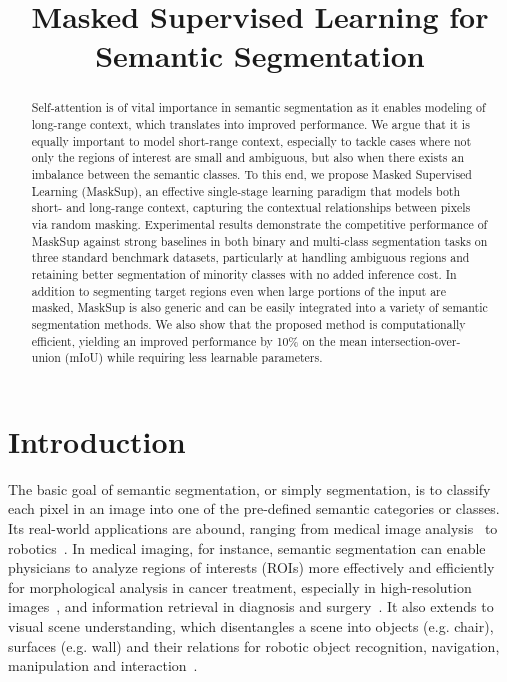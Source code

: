 \documentclass{bmvc2k}
\title{Masked Supervised Learning for Semantic Segmentation}
\begin{document}
\maketitle

\begin{abstract}
Self-attention is of vital importance in semantic segmentation as it enables modeling of long-range context, which translates into improved performance. We argue that it is equally important to model short-range context, especially to tackle cases where not only the regions of interest are small and ambiguous, but also when there exists an imbalance between the semantic classes. To this end, we propose Masked Supervised Learning (MaskSup), an effective single-stage learning paradigm that models both short- and long-range context, capturing the contextual relationships between pixels via random masking. Experimental results demonstrate the competitive performance of MaskSup against strong baselines in both binary and multi-class segmentation tasks on three standard benchmark datasets, particularly at handling ambiguous regions and retaining better segmentation of minority classes with no added inference cost. In addition to segmenting target regions even when large portions of the input are masked, MaskSup is also generic and can be easily integrated into a variety of semantic segmentation methods. We also show that the proposed method is computationally efficient, yielding an improved performance by 10\% on the mean intersection-over-union (mIoU) while requiring  less learnable parameters.
\end{abstract}




\section{Introduction}
The basic goal of semantic segmentation, or simply segmentation, is to classify each pixel in an image into one of the pre-defined semantic categories or classes. Its real-world applications are abound, ranging from medical image analysis~\cite{sirinukunwattana2017gland} to robotics~\cite{lai2011large}. In medical imaging, for instance, semantic segmentation can enable physicians to analyze regions of interests (ROIs) more effectively and efficiently for morphological analysis in cancer treatment, especially in high-resolution images~\cite{sirinukunwattana2017gland}, and information retrieval in diagnosis and surgery~\cite{jha2020kvasir}. It also extends to visual scene understanding, which disentangles a scene into objects (e.g. chair), surfaces (e.g. wall) and their relations for robotic object recognition, navigation, manipulation and interaction~\cite{lai2011large}.
\end{document}
